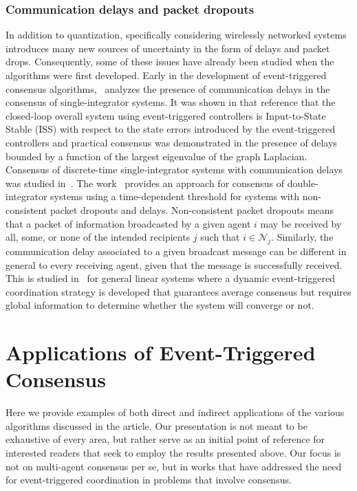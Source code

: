 \documentclass{autart}
\begin{document}
\subsubsection{Communication delays and packet dropouts}
In addition to quantization, specifically considering wirelessly
networked systems introduces many new sources of uncertainty in the
form of delays and packet drops. Consequently, some of these issues
have already been studied when the algorithms were first
developed. Early in the development of event-triggered consensus
algorithms,~\citep{GSS-DVD-KHJ:13} analyzes the presence of
communication delays in the consensus of single-integrator systems. It
was shown in that reference that the closed-loop overall system using
event-triggered controllers is Input-to-State Stable (ISS) with
respect to the state errors introduced by the event-triggered
controllers and practical consensus was demonstrated in the presence
of delays bounded by a function of the largest eigenvalue of the graph
Laplacian. Consensus of discrete-time single-integrator systems with
communication delays was studied in~\citep{LL-DH-SX:14}. The
work~\citep{EG-YC-DWC:16} provides an approach for consensus of
double-integrator systems using a time-dependent threshold for systems
with non-consistent packet dropouts and delays. Non-consistent packet
dropouts means that a packet of information broadcasted by a given
agent $i$ may be received by all, some, or none of the intended
recipients $j$ such that $i\in \mathcal{N}_j$. Similarly, the
communication delay associated to a given broadcast message can be
different in general to every receiving agent, given that the message
is successfully received. {This is studied in~\cite{VSD-MA-WPMHH:17}
for general linear systems where a dynamic event-triggered
coordination strategy is developed that guarantees average consensus
but requires global information to determine whether the system will
converge or not.}

\section{Applications of Event-Triggered
  Consensus}\label{se:applications}

{Here we provide examples of both direct and indirect
  applications of the various algorithms discussed in the article.
  Our presentation is not meant to be exhaustive of every area, but
  rather serve as an initial point of reference for interested readers
  that seek to employ the results presented above. Our focus is not on
  multi-agent consensus per se, but in works that have addressed the
  need for event-triggered coordination in problems that involve
  consensus.}
\end{document}
